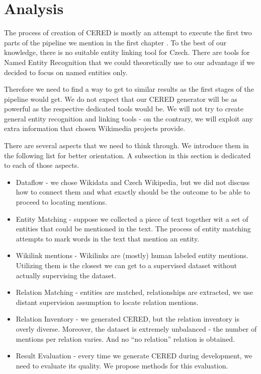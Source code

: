 \section{Analysis}
\label{text:Analysis}
The process of creation of CERED is mostly an attempt to execute the first two parts of the pipeline we mention in the first chapter . To the best of our knowledge, there is no suitable entity linking tool for Czech. There are tools for Named Entity Recognition that we could theoretically use to our advantage if we decided to focus on named entities only.

Therefore we need to find a way to get to similar results as the first stages of the pipeline would get. We do not expect that our CERED generator will be as powerful as the respective dedicated tools would be. We will not try to create general entity recognition and linking tools - on the contrary, we will exploit any extra information that chosen Wikimedia projects provide.

There are several aspects that we need to think through. We introduce them in the following list for better orientation. A subsection in this section is dedicated to each of those aspects. 
\begin{itemize}
 \item  Dataflow - we chose Wikidata and Czech Wikipedia, but we did not discuss how to connect them and what exactly should be the outcome to be able to proceed to locating mentions.
 \item  Entity Matching - suppose we collected a piece of text together wit a set of entities that could be mentioned in the text. The process of entity matching attempts to mark words in the text that mention an entity.
 \item  Wikilink mentions - Wikilinks are (mostly) human labeled entity mentions. Utilizing them is the closest we can get to a supervised dataset without actually supervising the dataset.
 \item  Relation Matching - entities are matched, relationships are extracted, we use distant supervision assumption to locate relation mentions.
\item Relation Inventory - we generated CERED, but the relation inventory is overly diverse. Moreover, the dataset is extremely unbalanced - the number of mentions per relation varies. And no “no relation” relation is obtained.
 \item  Result Evaluation - every time we generate CERED during development, we need to evaluate its quality. We propose methods for this evaluation. 
\end{itemize}





